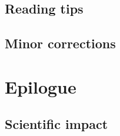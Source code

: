 \subsection{Reading tips}

\subsection{Minor corrections}



\section{Epilogue}
\subsection{Scientific impact}

